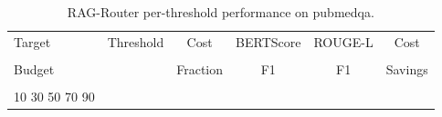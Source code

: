\begin{table}[t]
  \centering
  \caption{RAG-Router per-threshold performance on pubmedqa.}
  \label{tab:pareto_thresholds}
  \begin{tabular}{lccccc}
    \toprule
    Target & Threshold & Cost & BERTScore & ROUGE-L & Cost \\\\
    Budget &           & Fraction & F1 & F1 & Savings \\\\
    \midrule
    10%
    30%
    50%
    70%
    90%
    \bottomrule
  \end{tabular}
\end{table}
